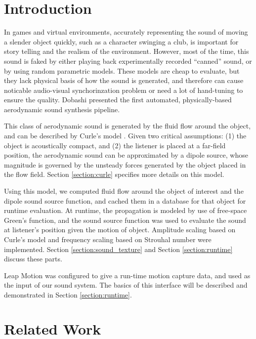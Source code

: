 \documentclass[tog]{acmsiggraph}
\begin{document}
\keywordlist


\copyrightspace


\section{Introduction} 

In games and virtual environments, accurately representing the sound of moving a slender object quickly, such as a character swinging a club, is important for story telling and the realism of the environment. However, most of the time, this sound is faked by either playing back experimentally recorded ``canned'' sound, or by using random parametric models. These models are cheap to evaluate, but they lack physical basis of how the sound is generated, and therefore can cause noticable audio-visual synchorinzation problem or need a lot of hand-tuning to ensure the quality. Dobashi \cite{dobashi2003} presented the first automated, physically-based aerodynamic sound synthesis pipeline.

This class of aerodynamic sound is generated by the fluid flow around the object, and can be described by Curle's model \cite{howe2002}. Given two critical assumptions: (1) the object is acoustically compact, and (2) the listener is placed at a far-field position, the aerodynamic sound can be approximated by a dipole source, whose magnitude is governed by the unsteady forces generated by the object placed in the flow field. Section \ref{section:curle} specifies more details on this model.

Using this model, we computed fluid flow around the object of interest and the dipole sound source function, and cached them in a database for that object for runtime evaluation. At runtime, the propagation is modeled by use of free-space Green's function, and the sound source function was used to evaluate the sound at listener's position given the motion of object. Amplitude scaling based on Curle's model and frequency scaling based on Strouhal number were implemented. Section \ref{section:sound_texture} and Section \ref{section:runtime} discuss these parts. 

Leap Motion was configured to give a run-time motion capture data, and used as the input of our sound system. The basics of this interface will be described and demonstrated in Section \ref{section:runtime}. 



\section{Related Work} 
\end{document}
